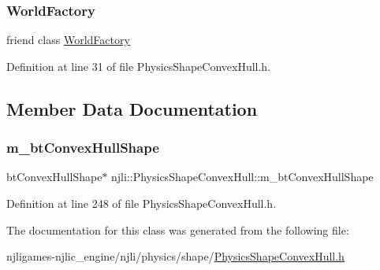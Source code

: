 \subsubsection{\texorpdfstring{World\+Factory}{WorldFactory}}
{\footnotesize\ttfamily friend class \mbox{\hyperlink{classnjli_1_1_world_factory}{World\+Factory}}\hspace{0.3cm}{\ttfamily [friend]}}



Definition at line 31 of file Physics\+Shape\+Convex\+Hull.\+h.



\subsection{Member Data Documentation}
\mbox{\label{classnjli_1_1_physics_shape_convex_hull_adf9e91ee0f43ffa85eb61ba6237c233d}} 
\subsubsection{\texorpdfstring{m\+\_\+bt\+Convex\+Hull\+Shape}{m\_btConvexHullShape}}
{\footnotesize\ttfamily bt\+Convex\+Hull\+Shape$\ast$ njli\+::\+Physics\+Shape\+Convex\+Hull\+::m\+\_\+bt\+Convex\+Hull\+Shape\hspace{0.3cm}{\ttfamily [private]}}



Definition at line 248 of file Physics\+Shape\+Convex\+Hull.\+h.



The documentation for this class was generated from the following file\+:\begin{DoxyCompactItemize}
\item 
njligames-\/njlic\+\_\+engine/njli/physics/shape/\mbox{\hyperlink{_physics_shape_convex_hull_8h}{Physics\+Shape\+Convex\+Hull.\+h}}\end{DoxyCompactItemize}
